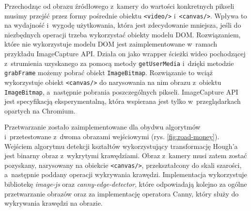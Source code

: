 Przechodząc od obrazu źródłowego z~kamery do wartości konkretnych pikseli musimy przejść przez formy pośrednie obiektu \lstinline{<video/>} i~\lstinline{<canvas/>}. Wpływa to na wydajność i~wygodę użytkowania, która jest zdecydowanie mniejsza, jeśli do niezbędnych operacji trzeba wykorzystać obiekty modelu DOM. Rozwiązaniem, które nie wykorzystuje modelu DOM jest zaimplementowane w~ramach przykładu ImageCapture API. Działa on jako wrapper ścieżki wideo pochodzącej z~strumienia uzyskanego za pomocą metody \lstinline{getUserMedia} i~dzięki metodzie \lstinline{grabFrame} możemy pobrać obiekt \lstinline{ImageBitmap}. Rozwiązanie to wciąż wykorzystuje obiekt \lstinline{<canvas/>} do narysowania na nim obrazu z~obiektu \lstinline{ImageBitmap}, a~następnie pobrania poszczególnych pikseli. ImageCapture API jest specyfikacją eksperymentalną, która wspierana jest tylko w~przeglądarkach opartych na Chromium.

Przetwarzanie zostało zaimplementowane dla obydwu algorytmów i~przetestowane z~dwoma obrazami wejściowymi (rys. \ref{fig:road-money}). Wejściem algorytmu detekcji kształtów wykorzystujący transformację Hough'a jest binarny obraz z~wykrytymi krawędziami. Obraz z~kamery musi zatem zostać pozyskany, narysowany na obiekcie \lstinline{<canvas/>}, przekształcony do skali szarości, a~następnie poddany operacji wykrywania krawędzi. Implementacja wykorzystuje bibliotekę \textit{image-js}\cite{image-js} oraz \textit{canny-edge-detector}\cite{canny}, które odpowiadają kolejno za ogólne przetwarzanie obrazów oraz za implementację operatora Canny, który służy do wykrywania krawędzi na obrazie. 

